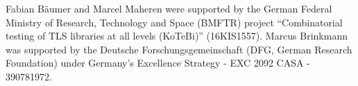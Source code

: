 Fabian Bäumer and Marcel Maheren were supported by the German Federal Ministry of Research, Technology and Space (BMFTR) project ``Combinatorial testing of TLS libraries at all levels (KoTeBi)'' (16KIS1557). Marcus Brinkmann was supported by the Deutsche Forschungsgemeinschaft (DFG, German Research Foundation) under Germany's Excellence Strategy - EXC 2092 CASA - 390781972.
